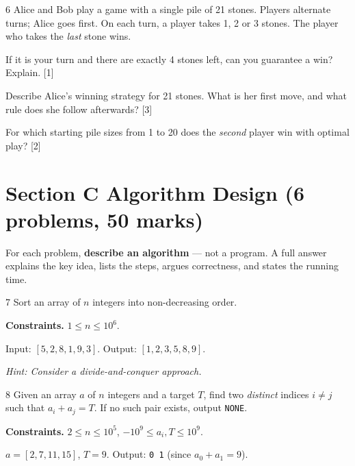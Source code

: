 \begin{problem}{6}
Alice and Bob play a game with a single pile of 21 stones. Players
alternate turns; Alice goes first. On each turn, a player takes 1, 2 or 3
stones. The player who takes the \emph{last} stone wins.
\begin{parts}
  \item If it is your turn and there are exactly 4 stones left, can you
        guarantee a win? Explain. \hfill [1]
  \item Describe Alice's winning strategy for 21 stones. What is her
        first move, and what rule does she follow afterwards? \hfill [3]
  \item For which starting pile sizes from 1 to 20 does the \emph{second}
        player win with optimal play? \hfill [2]
\end{parts}
\answerline
\end{problem}

\section*{Section C \quad Algorithm Design \hfill\normalsize (6 problems, 50 marks)}

\noindent For each problem, \textbf{describe an algorithm} --- not a program.
A full answer explains the key idea, lists the steps, argues correctness, and states the
running time.

\begin{problem}{7}
Sort an array of $n$ integers into non-decreasing order.

\smallskip\noindent\textbf{Constraints.} $1 \le n \le 10^6$.

\begin{example}
Input: $[5,2,8,1,9,3]$. Output: $[1,2,3,5,8,9]$.
\end{example}
\task
\noindent\textit{Hint: Consider a \emph{divide-and-conquer} approach.}
\end{problem}

\begin{problem}{8}
Given an array $a$ of $n$ integers and a target $T$, find two
\emph{distinct} indices $i \ne j$ such that $a_i + a_j = T$.
If no such pair exists, output \texttt{NONE}.

\smallskip\noindent\textbf{Constraints.} $2 \le n \le 10^5$,
$-10^9 \le a_i, T \le 10^9$.

\begin{example}
$a = [2, 7, 11, 15]$, $T = 9$. Output: \texttt{0 1}
(since $a_0 + a_1 = 9$).
\end{example}
\task
\end{problem}

